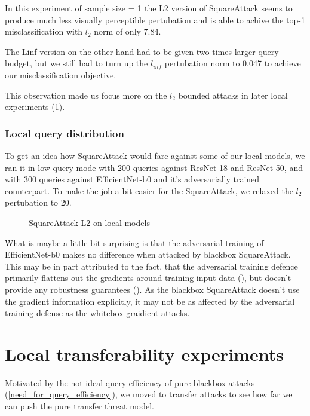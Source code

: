 In this experiment of sample size = 1 the L2 version of SquareAttack seems to produce much less visually perceptible pertubation and is able to achive the top-1 misclassification with $l_2$ norm of only 7.84.

The Linf version on the other hand had to be given two times larger query budget, but we still had to turn up the $l_{inf}$ pertubation norm to 0.047 to achieve our misclassification objective.


This observation made us focus more on the $l_2$ bounded attacks in later local experiments (\ref{local_transfer}).

\subsubsection{Local query distribution}
To get an idea how SquareAttack would fare against some of our local models, we ran it in low query mode with 200 queries against ResNet-18 and ResNet-50, and with 300 queries against EfficientNet-b0 and it's adversarially trained counterpart. To make the job a bit easier for the SquareAttack, we relaxed the $l_2$ pertubation to 20.

\begin{figure}[!htb]
\centering
 \hfill
 \hfill
\caption{SquareAttack L2 on local models}
\end{figure}

What is maybe a little bit surprising is that the adversarial training of EfficientNet-b0 makes no difference when attacked by blackbox SquareAttack. This may be in part attributed to the fact, that the adversarial training defence primarily flattens out the gradients around training input data (\cite{Yu2018TowardsRT}), but doesn't provide any robustness guarantees (\cite{Kolter2018ProvableDA}). As the blackbox SquareAttack doesn't use the gradient information explicitly, it may not be as affected by the adversarial training defense as the whitebox graidient attacks.


\section{Local transferability experiments}
\label{local_transfer}
Motivated by the not-ideal query-efficiency of pure-blackbox attacks (\ref{need_for_query_efficiency}), we moved to transfer attacks to see how far we can push the pure transfer threat model.


